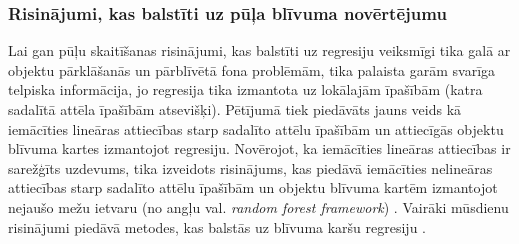 \subsubsection{Risinājumi, kas balstīti uz pūļa blīvuma novērtējumu}
Lai gan pūļu skaitīšanas risinājumi, kas balstīti uz regresiju veiksmīgi tika galā ar objektu pārklāšanās un pārblīvētā fona problēmām, tika palaista garām svarīga telpiska informācija, jo regresija tika izmantota uz lokālajām īpašībām (katra sadalītā attēla īpašībām atsevišķi). Pētījumā \cite{lempitsky2010learning} tiek piedāvāts jauns veids kā iemācīties lineāras attiecības starp sadalīto attēlu īpašībām un attiecīgās objektu blīvuma kartes izmantojot regresiju. Novērojot, ka iemācīties lineāras attiecības ir sarežģīts uzdevums, tika izveidots risinājums, kas piedāvā iemācīties nelineāras attiecības starp sadalīto attēlu īpašībām un objektu blīvuma kartēm izmantojot nejaušo mežu ietvaru (no angļu val. \textit{random forest framework}) \cite{pham2015count}. Vairāki mūsdienu risinājumi piedāvā metodes, kas balstās uz blīvuma karšu regresiju \cite{wang2016fast,xia2016block}. 

